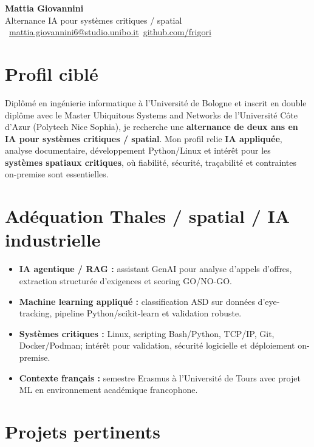 \documentclass[a4paper,10pt]{article}
\begin{document}
\begin{center}
  {\Huge\bfseries\color{darkgray} Mattia Giovannini}\\[0.3em]
  {\large\color{accent} Alternance IA pour systèmes critiques / spatial}\\[0.45em]
  \textcolor{lightgray}{\faEnvelope\ \href{mailto:mattia.giovannini6@studio.unibo.it}{mattia.giovannini6@studio.unibo.it}\quad\textbullet\quad\faGithub\ \href{https://github.com/frigori}{github.com/frigori}}
\end{center}

\section{Profil ciblé}
Diplômé en ingénierie informatique à l'Université de Bologne et inscrit en double diplôme avec le Master Ubiquitous Systems and Networks de l'Université Côte d'Azur (Polytech Nice Sophia), je recherche une \textbf{alternance de deux ans en IA pour systèmes critiques / spatial}. Mon profil relie \textbf{IA appliquée}, analyse documentaire, développement Python/Linux et intérêt pour les \textbf{systèmes spatiaux critiques}, où fiabilité, sécurité, traçabilité et contraintes on-premise sont essentielles.

\section{Adéquation Thales / spatial / IA industrielle}
\begin{itemize}
  \item \textbf{IA agentique / RAG :} assistant GenAI pour analyse d'appels d'offres, extraction structurée d'exigences et scoring GO/NO-GO.
  \item \textbf{Machine learning appliqué :} classification ASD sur données d'eye-tracking, pipeline Python/scikit-learn et validation robuste.
  \item \textbf{Systèmes critiques :} Linux, scripting Bash/Python, TCP/IP, Git, Docker/Podman; intérêt pour validation, sécurité logicielle et déploiement on-premise.
  \item \textbf{Contexte français :} semestre Erasmus à l'Université de Tours avec projet ML en environnement académique francophone.
\end{itemize}

\section{Projets pertinents}
\end{document}

